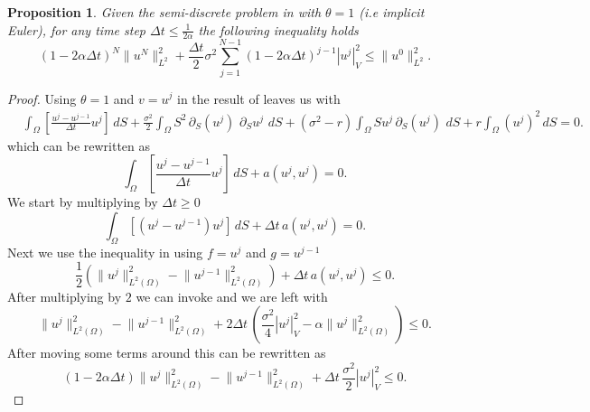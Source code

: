 \documentclass{article}
\newtheorem{prop}[thm]{Proposition}
\newcommand{\argwrapsquare}[1]{\left[#1\right]}
\newcommand{\intS}[1]{\ensuremath{\int_{\Omega}#1 \, dS}}
\newcommand{\intSlong}[1]{\intS{\argwrapsquare{#1}}}
\newcommand{\darg}[2]{\ensuremath{\, \partial_{#2}#1} \, }
\newcommand{\dS}[1]{\ensuremath{\darg{#1}{S}}}
\newcommand{\sigmafrac}{\ensuremath{\frac{\sigma^2}{2}}}
\newcommand{\seminormsq}[1]{\ensuremath{|#1|_V^2}}
\newcommand{\normsq}[1]{\ensuremath{\|#1\|_{L^2(\Omega)}^2}}
\begin{document}
\begin{prop}
    Given the semi-discrete problem in  with $\theta = 1$ (i.e implicit Euler), for any time step $\Delta t \leq \frac{1}{2 \alpha}$ the following inequality holds\\
    \begin{equation*}
        (1 - 2\alpha \Delta t)^N \| u^N \|_{L^2}^2 + \frac{\Delta t}{2} \sigma^2 \sum_{j=1}^{N-1} (1 - 2\alpha \Delta t)^{j-1} \seminormsq{u^j} \leq \| u^0 \|_{L^2}^2.
        \label{eq:placeholder_label}
    \end{equation*}
\end{prop}
\begin{proof}
    Using $\theta = 1$ and $v = u^j$ in the result of  leaves us with
    \begin{align*}
        &\intSlong{\frac{u^{j} - u^{j-1}}{\Delta t}  u^{j}} +\sigmafrac \intS{S^2 \dS{\left(u^{j}\right)} \dS{u^{j}}} + (\sigma^2 - r) \intS{S u^{j} \dS{\left(u^{j}\right)}} + r \intS{(u^{j})^2} =0.
        \end{align*}
    which can be rewritten as
    \begin{equation}\label{eq:discret_time_and_a_u_j+1}
        \intSlong{\frac{u^{j} - u^{j-1}}{\Delta t}  u^{j}} + a(u^{j},u^{j}) = 0.
    \end{equation}
   We start by multiplying  by $\Delta t \geq 0$
   \begin{equation*}
    \intSlong{(u^{j} - u^{j-1})  u^{j}} + \Delta t \,a(u^{j},u^{j}) = 0.
    \end{equation*}
    Next we use the inequality in  using $f = u^{j}$ and $g =u^{j-1}$
    \begin{equation*}
        \frac{1}{2}\left( \normsq{u^{j}} - \normsq{u^{j-1}} \right) + \Delta t \,a(u^{j},u^{j}) \leq 0.
    \end{equation*}
    After multiplying by $2$ we can invoke  and we are left with
    \begin{equation*}
         \normsq{u^{j}} - \normsq{u^{j-1}} + 2\Delta t \, \left( \frac{\sigma^2}{4} \seminormsq{u^{j}} - \alpha \normsq{u^{j}} \right) \leq 0.
    \end{equation*}
    After moving some terms around this can be rewritten as
    \begin{equation*}
        (1- 2\alpha \Delta t)\normsq{u^{j}}  - \normsq{u^{j-1}} + \Delta t \, \sigmafrac \seminormsq{u^{j}} \leq 0.
    \end{equation*}

\end{proof}
\end{document}
